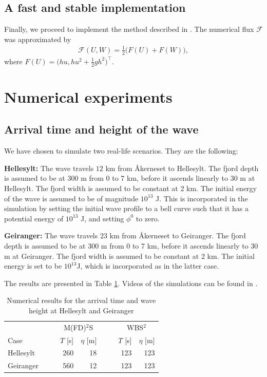 \documentclass[11pt]{article}
\begin{document}
\subsection{A fast and stable implementation}
Finally, we proceed to implement the method described in \cite{somRef2}. The numerical flux $\mathcal{F}$ was approximated by
\begin{align*}
    \mathcal{F}(U, W) = \frac{1}{2}\big(F(U) + F(W)\big),
\end{align*}
where $F(U) = \big(hu, hu^2 + \frac{1}{2}gh^2\big)^\top$.
%
%
\section{Numerical experiments}
\subsection{Arrival time and height of the wave}
We have chosen to simulate two real-life scenarios. They are the following:

\textbf{Hellesylt:} The wave travels $12$ km from Åkerneset to Hellesylt. The fjord depth is assumed to be at 300 m from 0 to 7 km, before it ascends linearly
to 30 m at Hellesylt. The fjord width is assumed to be constant at 2 km. The initial energy of the wave is assumed to be of magnitude $10^{13}$ J. This is incorporated in the simulation by
setting the initial wave profile to a bell curve such that it has a potential energy of $10^{13}$ J, and setting $\phi^0$ to zero.

\textbf{Geiranger:} The wave travels $23$ km from Åkerneset to Geiranger. The fjord depth is assumed to be at 300 m from 0 to 7 km, before it ascends linearly
to 30 m at Geiranger. The fjord width is assumed to be constant at 2 km. The initial energy is set to be $10^{13}$J, which is incorporated as in the latter case.

The results are presented in Table \ref{tab:TimeHeight}. Videos of the simulations can be found in \cite{}.
\begin{table}[H]
	\begin{center}
	    \begin{tabular}{l r r r r r r}
	                     &    $\quad$    &    \multicolumn{2}{c}{M(FD)$^2$S}    &    $\quad$    &    \multicolumn{2}{c}{WBS$^2$}      \\
	        Case         &               &    $T$ [s]    &    $\eta$ [m]        &               &    $T$ [s]    &    $\eta$ [m]    \\
            \hline                                                                               
            Hellesylt    &               &    260        &    18                &               &    123        &    123               \\
            Geiranger    &               &    560        &    12                &               &    123        &        123               \\
	    \end{tabular}
	\end{center}
	\caption{Numerical results for the arrival time and wave height at Hellesylt and Geiranger}
	\label{tab:TimeHeight}
\end{table}
\end{document}
